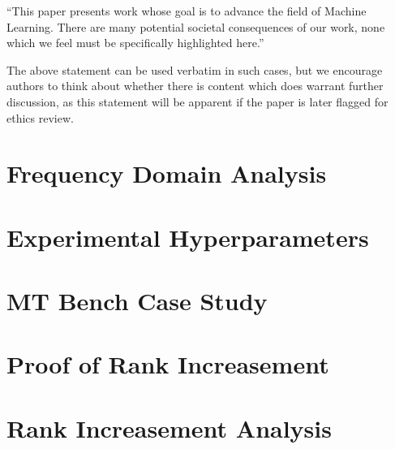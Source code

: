 \documentclass{article}
\theoremstyle{plain}
\theoremstyle{definition}
\theoremstyle{remark}
\begin{document}
``This paper presents work whose goal is to advance the field of 
Machine Learning. There are many potential societal consequences 
of our work, none which we feel must be specifically highlighted here.''

The above statement can be used verbatim in such cases, but we 
encourage authors to think about whether there is content which does 
warrant further discussion, as this statement will be apparent if the 
paper is later flagged for ethics review.


\nocite{langley00}





\newpage
\appendix
\onecolumn

\section{Frequency Domain Analysis}

\section{Experimental Hyperparameters}

\section{MT Bench Case Study}

\section{Proof of Rank Increasement}




\section{Rank Increasement Analysis}
\label{appendix:rank_increasement}
\end{document}
